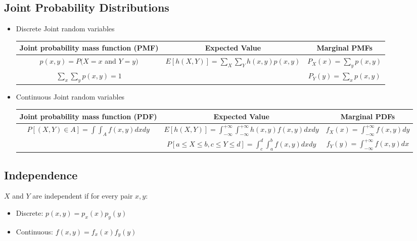 \documentclass{article}
\begin{document}
\subsection*{Joint Probability Distributions}
\begin{itemize}
    \item Discrete Joint random variables
    \begin{table}[H]
    \centering
    \begin{tabular}{c| c| c}  
        Joint probability mass function (PMF) & Expected Value & Marginal PMFs\\ [0.7ex] \hline 
        \addlinespace[.4ex] $p(x,y)=P(X=x$ and $Y=y)$ 
        & 
        $\displaystyle E[h(X,Y)]=\sum_{X}\sum_{Y}h(x,y)p(x,y)$
        &
        $P_{X}(x)=\sum_{y}p(x,y)$\\ 
        
        $\sum_{x}\sum_{y}p(x,y)=1$
        &
        &
        $P_{Y}(y)=\sum_{x}p(x,y)$\\ 
    \end{tabular}
\end{table}

    \item Continuous Joint random variables
    \begin{table}[H]
    \centering
   \begin{adjustbox}{width=\columnwidth,center}
    \begin{tabular}{c| c| c}  
        Joint probability mass function (PDF) & Expected Value & Marginal PDFs\\ [0.7ex] \hline 
        \addlinespace[.4ex] $\displaystyle P[(X,Y)\in A]=\int\int_{A} f(x,y) dx dy$
        &
        $\displaystyle E[h(X,Y)]=\int_{-\infty}^{+\infty}\int_{-\infty}^{+\infty}h(x,y)f(x,y)dx dy$
        & 
        $\displaystyle f_{X}(x)=\int_{-\infty}^{+\infty} f(x,y)dy$ \\ [2ex]
        
        &
        $\displaystyle P[a\leq X\leq b, c \leq Y \leq d]=\int_{c}^{d}\int_{a}^{b}f(x,y)dx dy$
        & 
        $\displaystyle f_{Y}(y)=\int_{-\infty}^{+\infty} f(x,y)dx$
    \end{tabular}
    \end{adjustbox}
\end{table}
\end{itemize}

\vspace{-1cm}
\subsection*{Independence}
$X$ and $Y$ are independent if for every pair $x, y$:
\begin{itemize}
    \item Discrete: \quad $p(x,y) = p_{x}(x)p_{y}(y)$
    \item Continuous: \quad $f(x,y) = f_{x}(x)f_{y}(y)$
\end{itemize}
\end{document}
